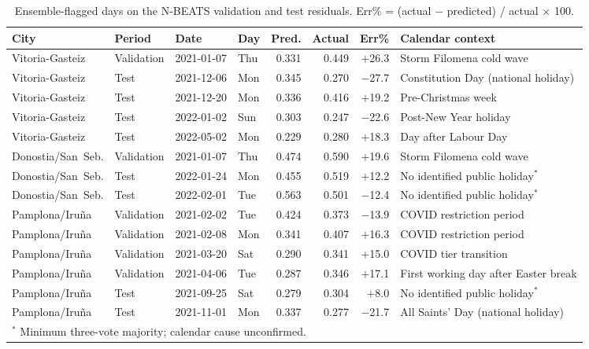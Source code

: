 ﻿\documentclass[12pt,reqno, twoside]{amsbook}
\numberwithin{figure}{chapter}
\numberwithin{table}{chapter}
\numberwithin{equation}{chapter}
\theoremstyle{plain}
\numberwithin{equation}{chapter}
\numberwithin{section}{chapter}
\begin{document}
\begin{table}[htbp]
\centering
\caption{Ensemble-flagged days on the N-BEATS validation and test residuals. Err\% = (actual $-$ predicted) / actual $\times$ 100.}
\label{tab:val_test_days}
\begin{adjustbox}{max width=\textwidth}
\begin{tabular}{llllrrrl}
\toprule
\textbf{City} & \textbf{Period} & \textbf{Date} & \textbf{Day} & \textbf{Pred.} & \textbf{Actual} & \textbf{Err\%} & \textbf{Calendar context} \\
\midrule
Vitoria-Gasteiz & Validation &2021-01-07 & Thu & 0.331 & 0.449 & $+$26.3 & Storm Filomena cold wave \\
Vitoria-Gasteiz & Test &2021-12-06 & Mon & 0.345 & 0.270 & $-$27.7 & Constitution Day (national holiday) \\
Vitoria-Gasteiz & Test &2021-12-20 & Mon & 0.336 & 0.416 & $+$19.2 & Pre-Christmas week \\
Vitoria-Gasteiz & Test &2022-01-02 & Sun & 0.303 & 0.247 & $-$22.6 & Post-New Year holiday \\
Vitoria-Gasteiz & Test &2022-05-02 & Mon & 0.229 & 0.280 & $+$18.3 & Day after Labour Day \\
Donostia/San~Seb. & Validation &2021-01-07 & Thu & 0.474 & 0.590 & $+$19.6 & Storm Filomena cold wave \\
Donostia/San~Seb. & Test &2022-01-24 & Mon & 0.455 & 0.519 & $+$12.2 & No identified public holiday$^{*}$ \\
Donostia/San~Seb. & Test &2022-02-01 & Tue & 0.563 & 0.501 & $-$12.4 & No identified public holiday$^{*}$ \\
Pamplona/Iru\~{n}a & Validation &2021-02-02 & Tue & 0.424 & 0.373 & $-$13.9 & COVID restriction period \\
Pamplona/Iru\~{n}a & Validation &2021-02-08 & Mon & 0.341 & 0.407 & $+$16.3 & COVID restriction period \\
Pamplona/Iru\~{n}a & Validation &2021-03-20 & Sat & 0.290 & 0.341 & $+$15.0 & COVID tier transition \\
Pamplona/Iru\~{n}a & Validation &2021-04-06 & Tue & 0.287 & 0.346 & $+$17.1 & First working day after Easter break \\
Pamplona/Iru\~{n}a & Test &2021-09-25 & Sat & 0.279 & 0.304 & $+$8.0  & No identified public holiday$^{*}$ \\
Pamplona/Iru\~{n}a & Test &2021-11-01 & Mon & 0.337 & 0.277 & $-$21.7 & All Saints' Day (national holiday) \\
\bottomrule
\multicolumn{8}{l}{$^{*}$ Minimum three-vote majority; calendar cause unconfirmed.} \\
\end{tabular}
\end{adjustbox}
\end{table}
\end{document}
